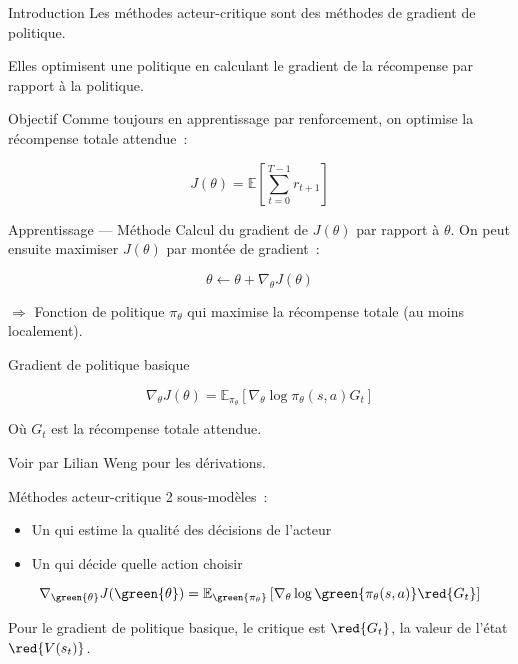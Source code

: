 \begin{frame}{Introduction}
  Les méthodes acteur-critique sont des méthodes de gradient de politique.

  Elles optimisent une politique en calculant le gradient de la récompense par rapport à la politique.
\end{frame}

\begin{frame}{Objectif}
  Comme toujours en apprentissage par renforcement, on optimise la récompense totale attendue~:

  \[
    J(\theta) = \mathbb{E}\left[\sum_{t=0}^{T-1}r_{t + 1}\right]
  \]
\end{frame}

\begin{frame}{Apprentissage --- Méthode}
  Calcul du gradient de $J(\theta)$ par rapport à $\theta$. On peut ensuite maximiser $J(\theta)$ par montée de gradient~:

  \[
    \theta \leftarrow \theta + \nabla_\theta J(\theta)
  \]

  $\Rightarrow$ Fonction de politique $\pi_\theta$ qui maximise la récompense totale (au moins localement).
\end{frame}

\begin{frame}{Gradient de politique basique}

  \[
    \nabla_\theta J(\theta) = \mathbb{E}_{\pi_\theta} \left[\nabla_\theta \log \pi_\theta(s, a)G_t\right]
  \]

  Où $G_t$ est la récompense totale attendue.

  Voir  par Lilian Weng pour les dérivations.
\end{frame}

\begin{frame}{Méthodes acteur-critique}
  2 sous-modèles~:

  \begin{itemize}
    \item Un  qui estime la qualité des décisions de l'acteur
    \item Un  qui décide quelle action choisir
  \end{itemize}

  \[
    \nabla_{\green{\theta}} J(\green{\theta}) = \mathbb{E}_{\green{\pi_\theta}} \left[\nabla_\theta \log \green{\pi_\theta(s, a)}\red{G_t}\right]
  \]

  Pour le gradient de politique basique, le critique est $\red{G_t}$, la valeur de l'état $\red{V(s_t)}$.
\end{frame}

